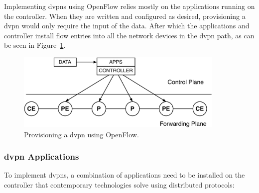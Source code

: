 Implementing \acp{dvpn} using OpenFlow relies mostly on the applications running on the controller. When they are written and configured as desired, provisioning a \ac{dvpn} would only require the input of the data. After which the applications and controller install flow entries into all the network devices in the \ac{dvpn} path, as can be seen in Figure~\ref{fig:nms-stack-of}.

\begin{figure}[h]
	\centering
	\includegraphics[width=10cm]{./includes/nms-stack-of.pdf}
	\caption{Provisioning a \ac{dvpn} using OpenFlow.}
	\label{fig:nms-stack-of}
\end{figure}

\subsubsection{\acs{dvpn} Applications} %
\label{ssub:dvpn_application}


To implement \acp{dvpn}, a combination of applications need to be installed on the controller that contemporary technologies solve using distributed protocols:

